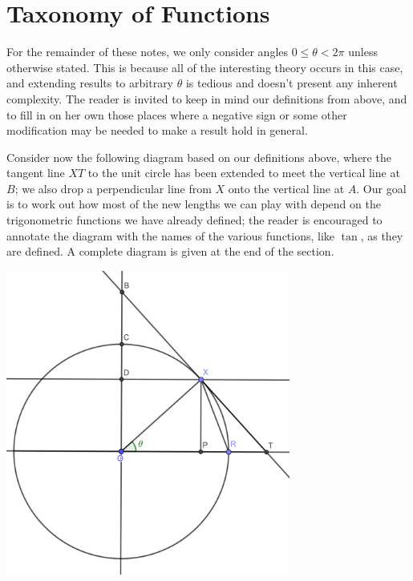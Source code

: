 \documentclass[a4paper,leqno]{article}
\numberwithin{equation}{section}
\theoremstyle{definition}
\theoremstyle{remark}
\begin{document}
\section{Taxonomy of Functions}
For the remainder of these notes, we only consider angles $ 0 \leq \theta < 2\pi $ unless otherwise stated. This is because
all of the interesting theory occurs in this case, and extending results to arbitrary $ \theta $ is tedious and doesn't present
any inherent complexity. The reader is invited to keep in mind our definitions from above, and to fill in on her own those
places where a negative sign or some other modification may be needed to make a result hold in general.

Consider now the following diagram based on our definitions above, where the tangent line $ XT $ to the unit circle has been
extended to meet the vertical line at $ B $; we also drop a perpendicular line from $ X $ onto the vertical line at $ A $.
Our goal is to work out how most of the new lengths we can play with depend on the trigonometric functions we have already
defined; the reader is encouraged to annotate the diagram with the names of the various functions, like $ \tan $, as they
are defined. A complete diagram is given at the end of the section.
\begin{center}
  \includegraphics[width=0.7\textwidth]{taxonomy}
\end{center}
\end{document}
